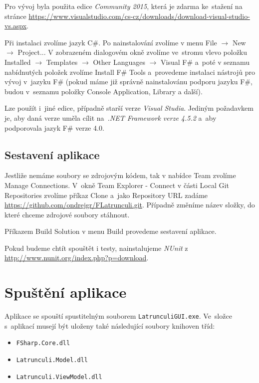 \documentclass[12pt]{article}
\begin{document}
Pro vývoj byla použita edice \emph{Community 2015}, která je zdarma ke~stažení na stránce \url{https://www.visualstudio.com/cs-cz/downloads/download-visual-studio-vs.aspx}. 

Při instalaci zvolíme jazyk C\#. Po nainstalování zvolíme v menu File $\rightarrow$ New $\rightarrow$ Project... V zobrazeném dialogovém okně zvolíme ve~stromu vlevo položku Installed $\rightarrow$ Templates $\rightarrow$ Other Languages $\rightarrow$ Visual F\# a~poté v seznamu nabídnutých položek zvolíme Install F\# Tools a~provedeme instalaci nástrojů pro vývoj v~jazyku F\# (pokud máme již správně nainstalovánu podporu jazyku F\#, budou v~seznamu položky Console Application, Library a další).

Lze použít i~jiné edice, případně starší verze \emph{Visual Studia}. Jediným požadavkem je, aby daná verze uměla cílit na~\emph{.NET Framework verze 4.5.2} a~aby podporovala jazyk F\# verze 4.0.
\subsection{Sestavení aplikace}
Jestliže nemáme soubory se zdrojovým kódem, tak v nabídce Team zvolíme Manage Connections. V~okně Team Explorer - Connect v části Local Git Repositories zvolíme příkaz Clone a~jako Repository URL zadáme \url{https://github.com/ondrejgr/FLatrunculi.git}. Případně změníme název složky, do které chceme zdrojové soubory stáhnout.

Příkazem Build Solution v menu Build provedeme sestavení aplikace.

Pokud budeme chtít spouštět i testy, nainstalujeme \emph{NUnit} z \url{http://www.nunit.org/index.php?p=download}.

\section{Spuštění aplikace}
Aplikace se spouští spustitelným souborem \texttt{LatrunculiGUI.exe}. Ve~složce s~aplikací musejí být uloženy také následující soubory knihoven tříd:
	\begin{itemize}  
		\item \texttt{FSharp.Core.dll}
		\item \texttt{Latrunculi.Model.dll}
		\item \texttt{Latrunculi.ViewModel.dll}
	\end{itemize}
\end{document}
